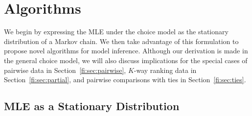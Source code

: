 \section{Algorithms}
\label{fi:sec:algorithms}

We begin by expressing the MLE under the choice model as the stationary distribution of a Markov chain.
We then take advantage of this formulation to propose novel algorithms for model inference.
Although our derivation is made in the general choice model, we will also discuss implications for the special cases of pairwise data in Section~\ref{fi:sec:pairwise}, $K$-way ranking data in Section~\ref{fi:sec:partial}, and pairwise comparisons with ties in Section~\ref{fi:sec:ties}.

\subsection{MLE as a Stationary Distribution}

